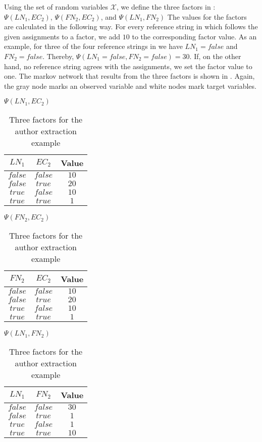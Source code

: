 Using the set of \glspl{random variable} $\mathcal{X}$, we define the three factors in : $\Psi(LN_1,EC_2)$, $\Psi(FN_2,EC_2)$, and $\Psi(LN_1,FN_2)$
The values for the factors are calculated in the following way.
For every reference string in  which follows the given \glspl{assignment} to a \gls{factor}, we add $10$ to the corresponding factor value.
As an example, for three of the four reference strings in  we have $LN_1=false$ and $FN_2=false$.
Thereby, $\Psi(LN_1=false,FN_2=false)=30$.
If, on the other hand, no reference string agrees with the \glspl{assignment}, we set the factor value to one.
The \gls{markov network} that results from the three \glspl{factor} is shown in .
Again, the gray \gls{node} marks an \gls{observed variable} and white \glspl{node} mark \glspl{target variable}.

\begin{table}[t]
\begin{minipage}{0.5\linewidth}
\centering
$\Psi(LN_1,EC_2)$\par
\smallskip
\begin{tabular}{c c c}
 \toprule
 $LN_1$ & $EC_2$ & Value \\
 \midrule
 $false$ & $false$ & $10$ \\
 $false$ & $true$ & $20$ \\
 $true$ & $false$ & $10$ \\
 $true$ & $true$ & $1$ \\
 \bottomrule
\end{tabular}
\end{minipage}
\hfill
\begin{minipage}{0.5\linewidth}
\centering
$\Psi(FN_2,EC_2)$\par
\smallskip
\begin{tabular}{c c c}
 \toprule
 $FN_2$ & $EC_2$ & Value \\
 \midrule
 $false$ & $false$ & $10$ \\
 $false$ & $true$ & $20$ \\
 $true$ & $false$ & $10$ \\
 $true$ & $true$ & $1$ \\
 \bottomrule
\end{tabular}
\end{minipage}
\medskip
\begin{center}
$\Psi(LN_1,FN_2)$\par
\smallskip
\begin{tabular}{c c c}
 \toprule
 $LN_1$ & $FN_2$ & Value \\
 \midrule
 $false$ & $false$ & $30$ \\
 $false$ & $true$ & $1$ \\
 $true$ & $false$ & $1$ \\
 $true$ & $true$ & $10$ \\
 \bottomrule
\end{tabular}
\end{center}

\caption{Three factors for the author extraction example}
\label{tab:example-factors}
\end{table}

